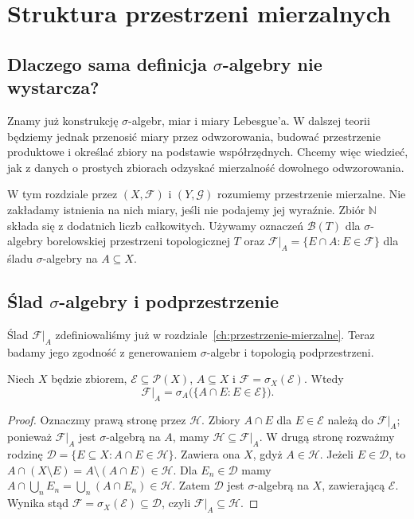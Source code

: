 \chapter{Struktura przestrzeni mierzalnych}
\label{ch:struktura-przestrzeni}

\section{Dlaczego sama definicja \texorpdfstring{$\sigma$}{sigma}-algebry nie wystarcza?}

Znamy już konstrukcję $\sigma$-algebr, miar i miary Lebesgue'a.
W dalszej teorii będziemy jednak przenosić miary przez odwzorowania,
budować przestrzenie produktowe i określać zbiory na podstawie
współrzędnych. Chcemy więc wiedzieć, jak z danych o prostych
zbiorach odzyskać mierzalność dowolnego odwzorowania.

W tym rozdziale przez $(X,\mathcal F)$ i $(Y,\mathcal G)$ rozumiemy
przestrzenie mierzalne. Nie zakładamy istnienia na nich miary,
jeśli nie podajemy jej wyraźnie. Zbiór $\mathbb N$ składa się z
dodatnich liczb całkowitych. Używamy oznaczeń
$\mathcal B(T)$ dla $\sigma$-algebry borelowskiej przestrzeni
topologicznej $T$ oraz $\mathcal F|_A=\{E\cap A:E\in\mathcal F\}$
dla śladu $\sigma$-algebry na $A\subseteq X$.

\section{Ślad \texorpdfstring{$\sigma$}{sigma}-algebry i podprzestrzenie}

Ślad $\mathcal F|_A$ zdefiniowaliśmy już w rozdziale~\ref{ch:przestrzenie-mierzalne}.
Teraz badamy jego zgodność z generowaniem $\sigma$-algebr
i topologią podprzestrzeni.


\begin{lemat}
\label{lem:trace-generation}
Niech $X$ będzie zbiorem, $\mathcal E\subseteq\mathcal P(X)$,
$A\subseteq X$ i $\mathcal F=\sigma_X(\mathcal E)$.
Wtedy
\[
\mathcal F|_A=\sigma_A\bigl(\{A\cap E:E\in\mathcal E\}\bigr).
\]
\end{lemat}
\begin{proof}
Oznaczmy prawą stronę przez $\mathcal H$. Zbiory
$A\cap E$ dla $E\in\mathcal E$ należą do $\mathcal F|_A$;
ponieważ $\mathcal F|_A$ jest $\sigma$-algebrą na $A$,
mamy $\mathcal H\subseteq\mathcal F|_A$.
W drugą stronę rozważmy rodzinę
$\mathcal D=\{E\subseteq X:A\cap E\in\mathcal H\}$.
Zawiera ona $X$, gdyż $A\in\mathcal H$. Jeżeli
$E\in\mathcal D$, to
$A\cap(X\setminus E)=A\setminus(A\cap E)\in\mathcal H$.
Dla $E_n\in\mathcal D$ mamy
$A\cap\bigcup_nE_n=\bigcup_n(A\cap E_n)\in\mathcal H$.
Zatem $\mathcal D$ jest $\sigma$-algebrą na $X$, zawierającą
$\mathcal E$. Wynika stąd
$\mathcal F=\sigma_X(\mathcal E)\subseteq\mathcal D$, czyli
$\mathcal F|_A\subseteq\mathcal H$.
\end{proof}


